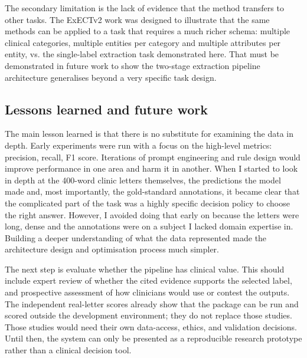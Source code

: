 \documentclass[conference]{IEEEtran}
\begin{document}
The secondary limitation is the lack of evidence that the method transfers to
other tasks. The ExECTv2 work was designed to illustrate that the same methods
can be applied to a task that requires a much richer schema: multiple clinical 
categories, multiple entities per category and multiple attributes per entity, vs.
the single-label extraction task demonstrated here. That must be demonstrated 
in future work to show the two-stage extraction pipeline architecture generalises
beyond a very specific task design.

\subsection{Lessons learned and future work}

The main lesson learned is that there is no substitute for examining the data
in depth. Early experiments were run with a focus on the high-level metrics:
precision, recall, F1 score. Iterations of prompt engineering and rule design 
would improve performance in one area and harm it in another. When
I started to look in depth at the 400-word clinic letters themselves, the predictions
the model made and, most importantly, the gold-standard annotations, it became
clear that the complicated part of the task was a highly specific decision policy
to choose the right answer. However, I avoided doing that early on because the
letters were long, dense and the annotations were on a subject I lacked domain
expertise in. Building a deeper understanding of what the data represented
made the architecture design and optimisation process much simpler.

The next step is evaluate whether the pipeline has clinical value. This should include 
expert review of whether the cited evidence supports the selected label, and
prospective assessment of how clinicians would use or contest the outputs.
The independent real-letter scores already show that the package can be
run and scored outside the development environment; they do not replace
those studies. Those studies would need their own data-access, ethics, and
validation decisions. Until then, the system can only be presented as a
reproducible research prototype rather than a clinical decision tool.
\end{document}

